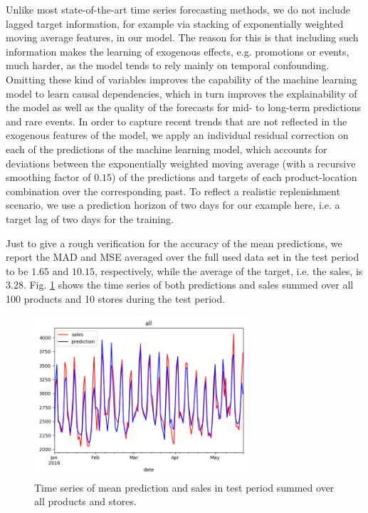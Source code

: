 \documentclass[BCOR=1mm, DIV=calc,10pt,
twoside=true,
twocolumn,
headings=normal]{scrartcl}
\newcommand{\fig}{Fig. }
\begin{document}
Unlike most state-of-the-art time series forecasting methods, we do not include lagged target information, for example via stacking of exponentially weighted moving average features, in our model. The reason for this is that including such information makes the learning of exogenous effects, e.g. promotions or events, much harder, as the model tends to rely mainly on temporal confounding. Omitting these kind of variables improves the capability of the machine learning model to learn causal dependencies, which in turn improves the explainability of the model as well as the quality of the forecasts for mid- to long-term predictions and rare events. In order to capture recent trends that are not reflected in the exogenous features of the model, we apply an individual residual correction on each of the predictions of the machine learning model, which accounts for deviations between the exponentially weighted moving average (with a recursive smoothing factor of $0.15$) of the predictions and targets of each product-location combination over the corresponding past. To reflect a realistic replenishment scenario, we use a prediction horizon of two days for our example here, i.e. a target lag of two days for the training.

\noindent
Just to give a rough verification for the accuracy of the mean predictions, we report the MAD and MSE averaged over the full used data set in the test period to be $1.65$ and $10.15$, respectively, while the average of the target, i.e. the sales, is $3.28$. \fig \ref{fig:mean_prediction} shows the time series of both predictions and sales summed over all 100 products and 10 stores during the test period.

\begin{figure}
\begin{center}
\includegraphics[width=8cm]{../figures/mean_prediction}
\caption{\label{fig:mean_prediction} Time series of mean prediction and sales in test period summed over all products and stores.}
\end{center}
\end{figure}
\end{document}
